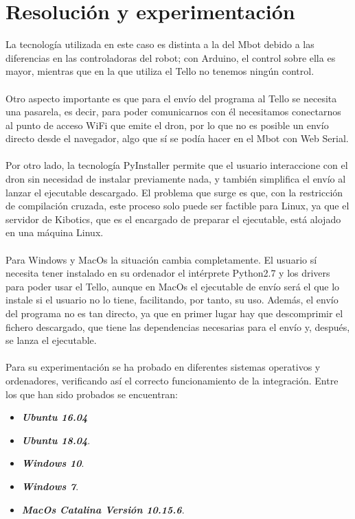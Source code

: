 \documentclass{report}
\begin{document}
\section{Resolución y experimentación}

La tecnología utilizada en este caso es distinta a la del Mbot debido a las diferencias en las controladoras del robot; con Arduino, el control sobre ella es mayor, mientras que en la que utiliza el Tello no tenemos ningún control.
\\
\\
Otro aspecto importante es que para el envío del programa al Tello se necesita una pasarela, es decir, para poder comunicarnos con él necesitamos conectarnos al punto de acceso WiFi que emite el dron, por lo que no es posible un envío directo desde el navegador, algo que sí se podía hacer en el Mbot con Web Serial.
\\
\\
Por otro lado, la tecnología PyInstaller permite que el usuario interaccione con el dron sin necesidad de instalar previamente nada, y también simplifica el envío al lanzar el ejecutable descargado. El problema que surge es que, con la restricción de compilación cruzada, este proceso solo puede ser factible para Linux, ya que el servidor de Kibotics, que es el encargado de preparar el ejecutable, está alojado en una máquina Linux.
\\
\\
Para Windows y MacOs la situación cambia completamente. El usuario sí necesita tener instalado en su ordenador el intérprete Python2.7 y los drivers para poder usar el Tello, aunque en MacOs el ejecutable de envío será el que lo instale si el usuario no lo tiene, facilitando, por tanto, su uso. Además, el envío del programa no es tan directo, ya que en primer lugar hay que descomprimir el fichero descargado, que tiene las dependencias necesarias para el envío y, después, se lanza el ejecutable.
\\ 
\\
Para su experimentación se ha probado en diferentes sistemas operativos y ordenadores, verificando así el correcto funcionamiento de la integración. Entre los que han sido probados se encuentran:

\begin{itemize}
	\item \textit{\textbf{Ubuntu 16.04}}
	\item \textit{\textbf{Ubuntu 18.04}}.
	\item \textit{\textbf{Windows 10}}.
	\item \textit{\textbf{Windows 7}}.
	\item \textit{\textbf{MacOs Catalina Versión 10.15.6}}.
\end{itemize}
\end{document}
